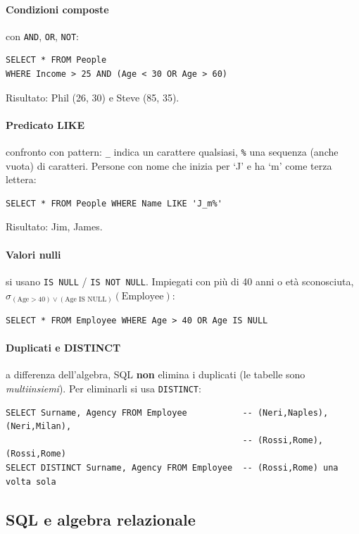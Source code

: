 \documentclass[a4paper,12pt]{article}
\begin{document}
\paragraph{Condizioni composte} con \texttt{AND}, \texttt{OR}, \texttt{NOT}:
\begin{verbatim}
SELECT * FROM People
WHERE Income > 25 AND (Age < 30 OR Age > 60)
\end{verbatim}
Risultato: Phil (26, 30) e Steve (85, 35).

\paragraph{Predicato LIKE} confronto con pattern: \texttt{\_} indica un
carattere qualsiasi, \texttt{\%} una sequenza (anche vuota) di caratteri.
Persone con nome che inizia per `J' e ha `m' come terza lettera:
\begin{verbatim}
SELECT * FROM People WHERE Name LIKE 'J_m%'
\end{verbatim}
Risultato: Jim, James.

\paragraph{Valori nulli} si usano \texttt{IS NULL} / \texttt{IS NOT NULL}.
Impiegati con più di 40 anni o età sconosciuta,
$\sigma_{(\text{Age}>40) \lor (\text{Age IS NULL})}(\text{Employee})$:
\begin{verbatim}
SELECT * FROM Employee WHERE Age > 40 OR Age IS NULL
\end{verbatim}

\paragraph{Duplicati e DISTINCT} a differenza dell'algebra, SQL \textbf{non}
elimina i duplicati (le tabelle sono \emph{multiinsiemi}). Per eliminarli si
usa \texttt{DISTINCT}:
\begin{verbatim}
SELECT Surname, Agency FROM Employee           -- (Neri,Naples), (Neri,Milan),
                                               -- (Rossi,Rome), (Rossi,Rome)
SELECT DISTINCT Surname, Agency FROM Employee  -- (Rossi,Rome) una volta sola
\end{verbatim}

\subsection{SQL e algebra relazionale}
\end{document}
